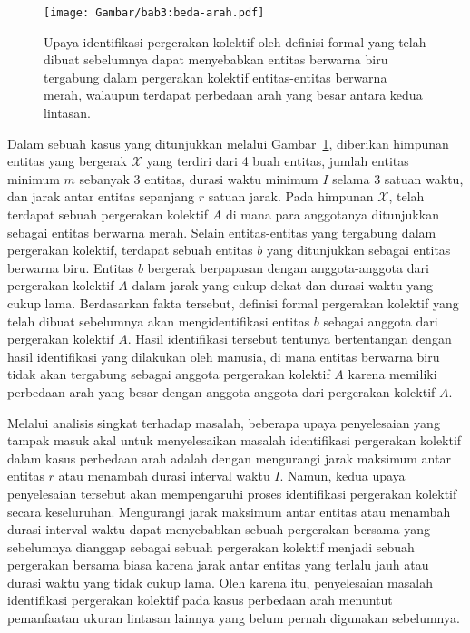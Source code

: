 \begin{figure}[h]
    \centering
    \captionsetup{width=0.75\textwidth}
    \texttt{[image: Gambar/bab3:beda-arah.pdf]}
    \caption[Masalah identifikasi pada kasus perbedaan arah]{Upaya identifikasi pergerakan kolektif oleh definisi formal yang telah dibuat sebelumnya dapat menyebabkan entitas berwarna biru tergabung dalam pergerakan kolektif entitas-entitas berwarna merah, walaupun terdapat perbedaan arah yang besar antara kedua lintasan.}
    \label{bab3:masalah-arah}
\end{figure}
    
Dalam sebuah kasus yang ditunjukkan melalui Gambar~\ref{bab3:masalah-arah}, diberikan himpunan entitas yang bergerak $\mathcal{X}$ yang terdiri dari 4 buah entitas, jumlah entitas minimum $m$ sebanyak $3$ entitas, durasi waktu minimum $I$ selama $3$ satuan waktu, dan jarak antar entitas sepanjang $r$ satuan jarak. Pada himpunan $\mathcal{X}$, telah terdapat sebuah pergerakan kolektif $A$ di mana para anggotanya ditunjukkan sebagai entitas berwarna merah. Selain entitas-entitas yang tergabung dalam pergerakan kolektif, terdapat sebuah entitas $b$ yang ditunjukkan sebagai entitas berwarna biru. Entitas $b$ bergerak berpapasan dengan anggota-anggota dari pergerakan kolektif $A$ dalam jarak yang cukup dekat dan durasi waktu yang cukup lama. Berdasarkan fakta tersebut, definisi formal pergerakan kolektif yang telah dibuat sebelumnya akan mengidentifikasi entitas $b$ sebagai anggota dari pergerakan kolektif $A$. Hasil identifikasi tersebut tentunya bertentangan dengan hasil identifikasi yang dilakukan oleh manusia, di mana entitas berwarna biru tidak akan tergabung sebagai anggota pergerakan kolektif $A$ karena memiliki perbedaan arah yang besar dengan anggota-anggota dari pergerakan kolektif $A$.
    
Melalui analisis singkat terhadap masalah, beberapa upaya penyelesaian yang tampak masuk akal untuk menyelesaikan masalah identifikasi pergerakan kolektif dalam kasus perbedaan arah adalah dengan mengurangi jarak maksimum antar entitas $r$ atau menambah durasi interval waktu $I$. Namun, kedua upaya penyelesaian tersebut akan mempengaruhi proses identifikasi pergerakan kolektif secara keseluruhan. Mengurangi jarak maksimum antar entitas atau menambah durasi interval waktu dapat menyebabkan sebuah pergerakan bersama yang sebelumnya dianggap sebagai sebuah pergerakan kolektif menjadi sebuah pergerakan bersama biasa karena jarak antar entitas yang terlalu jauh atau durasi waktu yang tidak cukup lama. Oleh karena itu, penyelesaian masalah identifikasi pergerakan kolektif pada kasus perbedaan arah menuntut pemanfaatan ukuran lintasan lainnya yang belum pernah digunakan sebelumnya.
    
